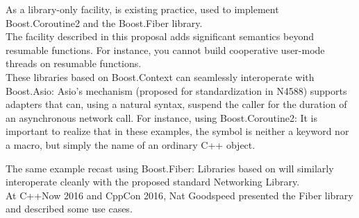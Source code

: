 \label{appendixa}
As a library-only facility,
\cite{bcontext} is existing practice,
used to implement Boost.Coroutine2\cite{bcoroutine2} and the
Boost.Fiber library\cite{bfiber}.\\
\newline
The facility described in this proposal adds significant semantics beyond
resumable functions. For instance, you cannot build cooperative user-mode
threads on resumable functions.\\
\newline
These libraries based on Boost.Context can seamlessly interoperate with
Boost.Asio\cite{basio}: Asio's  mechanism (proposed for
standardization in N4588\cite{N4588}) supports adapters that can, using a
natural syntax, suspend the caller for the duration of an asynchronous network
call. For instance, using Boost.Coroutine2:
It is important to realize that in these examples, the symbol  is
neither a keyword nor a macro, but simply the name of an ordinary C++ object.

The same example recast using Boost.Fiber:
Libraries based on \ectx will similarly interoperate cleanly with the proposed
standard Networking Library\cite{N4588}.\\
\newline
At C++Now 2016\cite{boostcon} and CppCon 2016\cite{cppcon}, Nat Goodspeed
presented the Fiber library and described some use cases.
